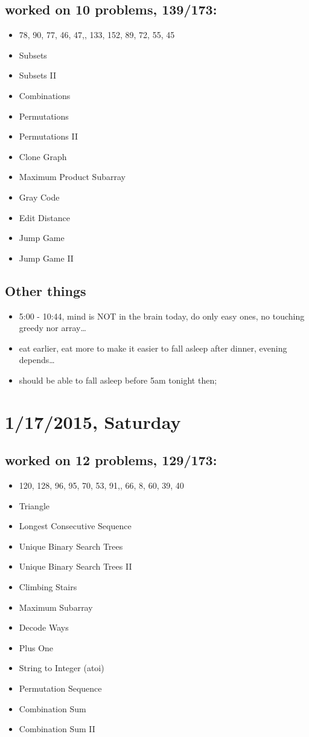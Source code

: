 \documentclass[9pt,b5paper]{article}
\begin{document}
\subsection{worked on 10 problems, 139/173:}
\label{sec-6-1}
\begin{itemize}
\item 78, 90, 77, 46, 47,, 133, 152, 89, 72, 55, 45
\item Subsets
\item Subsets II
\item Combinations
\item Permutations
\item Permutations II
\item Clone Graph
\item Maximum Product Subarray
\item Gray Code
\item Edit Distance
\item Jump Game
\item Jump Game II
\end{itemize}
\subsection{Other things}
\label{sec-6-2}
\begin{itemize}
\item 5:00 - 10:44, mind is NOT in the brain today, do only easy ones, no touching greedy nor array\ldots{}
\item eat earlier, eat more to make it easier to fall asleep after dinner, evening depends\ldots{}
\item should be able to fall asleep before 5am tonight then;
\end{itemize}
\section{1/17/2015, Saturday}
\label{sec-7}
\subsection{worked on 12 problems, 129/173:}
\label{sec-7-1}
\begin{itemize}
\item 120, 128, 96, 95, 70, 53, 91,, 66, 8, 60, 39, 40
\item Triangle
\item Longest Consecutive Sequence
\item Unique Binary Search Trees
\item Unique Binary Search Trees II
\item Climbing Stairs
\item Maximum Subarray
\item Decode Ways
\item Plus One
\item String to Integer (atoi)
\item Permutation Sequence
\item Combination Sum
\item Combination Sum II
\end{itemize}
\end{document}
